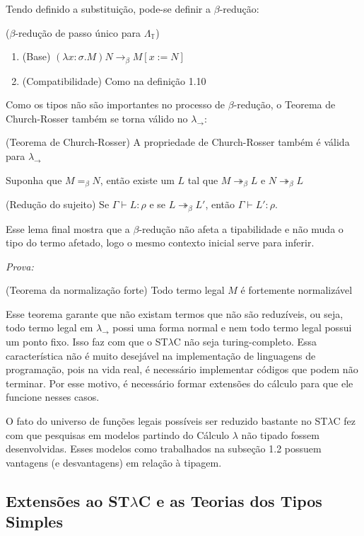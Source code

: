 \documentclass[../main.tex]{subfiles}
\begin{document}
Tendo definido a substituição, pode-se definir a $\beta$-redução:

\begin{definition}($\beta$-redução de passo único para $\Lambda_{\mathbb{T}}$)
    \hfill
    \begin{enumerate}
        \item (Base) $(\lambda x : \sigma . M)N \rightarrow_{\beta} M[x := N]$
        \item (Compatibilidade) Como na definição 1.10
    \end{enumerate}
\end{definition}

Como os tipos não são importantes no processo de $\beta$-redução, o Teorema de Church-Rosser também se torna válido no $\lambda_{\rightarrow}$:

\begin{theorem}(Teorema de Church-Rosser)
    A propriedade de Church-Rosser também é válida para $\lambda_{\rightarrow}$
\end{theorem}

\begin{corollary}
    Suponha que $M =_{\beta} N$, então existe um $L$ tal que $M \twoheadrightarrow_{\beta} L$ e $N \twoheadrightarrow_{\beta} L$
\end{corollary}

\begin{lemma}(Redução do sujeito)
    Se $\Gamma \vdash L : \rho$ e se $L \twoheadrightarrow_{\beta} L'$, então $\Gamma \vdash L' : \rho$.
\end{lemma}

Esse lema final mostra que a $\beta$-redução não afeta a tipabilidade e não muda o tipo do termo afetado, logo o mesmo contexto inicial serve para inferir.

\emph{Prova: }

\begin{theorem}(Teorema da normalização forte)
    Todo termo legal $M$ é fortemente normalizável
\end{theorem}

Esse teorema garante que não existam termos que não são reduzíveis, ou seja, todo termo legal em $\lambda_{\rightarrow}$ possi uma forma normal e nem todo termo legal possui um ponto fixo. Isso faz com que o ST$\lambda$C não seja turing-completo.
Essa característica não é muito desejável na implementação de linguagens de programação, pois na vida real, é necessário implementar códigos que podem não terminar. Por esse motivo, é necessário formar extensões do cálculo para que ele funcione nesses casos. 

O fato do universo de funções legais possíveis ser reduzido bastante no ST$\lambda$C fez com que pesquisas em modelos partindo do Cálculo $\lambda$ não tipado fossem desenvolvidas. Esses modelos como trabalhados na subseção 1.2 possuem vantagens (e desvantagens) em relação à tipagem.

\subsection[Extensões ao STLC e as Teorias dos Tipos Simples]{Extensões ao ST$\lambda$C e as Teorias dos Tipos Simples}
\end{document}
